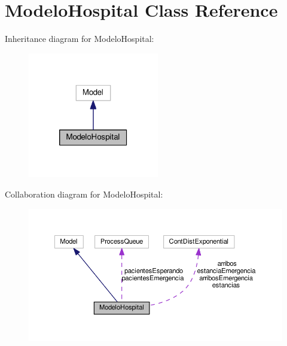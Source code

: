 \hypertarget{class_modelo_hospital}{\section{Modelo\-Hospital Class Reference}
\label{class_modelo_hospital}
}


Inheritance diagram for Modelo\-Hospital\-:\nopagebreak
\begin{figure}[H]
\begin{center}
\leavevmode
\includegraphics[width=162pt]{class_modelo_hospital__inherit__graph}
\end{center}
\end{figure}


Collaboration diagram for Modelo\-Hospital\-:\nopagebreak
\begin{figure}[H]
\begin{center}
\leavevmode
\includegraphics[width=350pt]{class_modelo_hospital__coll__graph}
\end{center}
\end{figure}
